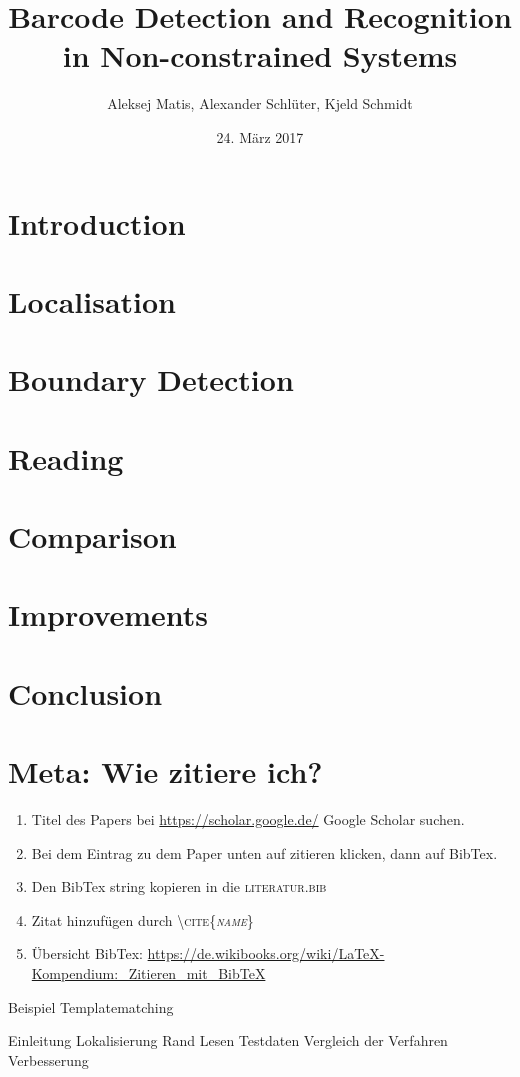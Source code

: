 \documentclass[12pt,a4paper]{article}
\author{Aleksej Matis, Alexander Schlüter, Kjeld Schmidt}
\title{Barcode Detection and Recognition in Non-constrained Systems}
\date{24. März 2017}
\begin{document}

\setcounter{page}{0}
\maketitle
\thispagestyle{empty} 
\tableofcontents
\newpage
\section{Introduction} 

\newpage

\section{Localisation} 

\newpage

\section{Boundary Detection} 

\newpage

\section{Reading} 
 
\newpage

\section{Comparison} 

\newpage

\section{Improvements} 

\newpage

\section{Conclusion} 

\newpage


\section{Meta: Wie zitiere ich?} 
\begin{enumerate}
\item Titel des Papers bei \url{https://scholar.google.de/} Google Scholar suchen.
\item Bei dem Eintrag zu dem Paper unten auf zitieren klicken, dann auf BibTex.
\item Den BibTex string kopieren in die \textsc{literatur.bib}
\item Zitat hinzufügen durch \textsc{\textbackslash cite\{\textit{name}\}}
\item Übersicht BibTex: \url{https://de.wikibooks.org/wiki/LaTeX-Kompendium:_Zitieren_mit_BibTeX}
\end{enumerate}
Beispiel Templatematching \cite{chen2014scanning}
%

Einleitung
Lokalisierung
Rand
Lesen
Testdaten
Vergleich der Verfahren
Verbesserung



%

\newpage
\appendix
\printbibliography
\end{document}
